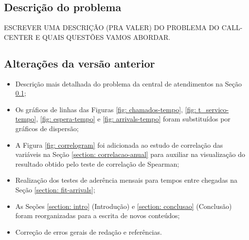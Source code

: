 \subsection{Descrição do problema}
\label{section: descricao}
ESCREVER UMA DESCRIÇÃO (PRA VALER) DO PROBLEMA DO CALL-CENTER E QUAIS QUESTÕES VAMOS ABORDAR.

\subsection{Alterações da versão anterior}
\begin{itemize}
    \item Descrição mais detalhada do problema da central de atendimentos na Seção \ref*{section: descricao};
    \item Os gráficos de linhas das Figuras \ref*{fig: chamados-tempo}, \ref*{fig: t_servico-tempo}, \ref*{fig: espera-tempo} e \ref*{fig: arrivals-tempo} foram substituídos por gráficos de dispersão;
    \item A Figura \ref*{fig: correlogram} foi adicionada ao estudo de correlação das variáveis na Seção \ref*{section: correlacao-anual} para auxiliar na visualização do resultado obtido pelo teste de correlação de Spearman;
    \item Realização dos testes de aderência mensais para tempos entre chegadas na Seção \ref*{section: fit-arrivals};
    \item As Seções \ref*{section: intro} (Introdução) e \ref*{section: conclusao} (Conclusão) foram reorganizadas para a escrita de novos conteúdos;
    \item Correção de erros gerais de redação e referências.
\end{itemize}